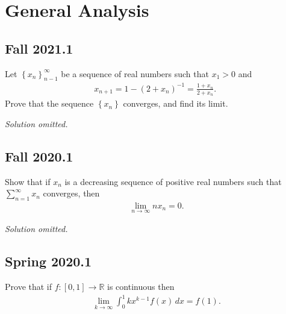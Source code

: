 \hypertarget{general-analysis}{%
\section{General Analysis}\label{general-analysis}}

\hypertarget{fall-2021.1}{%
\subsection{Fall 2021.1}\label{fall-2021.1}}

\begin{problem}[?]

Let \(\left\{x_{n}\right\}_{n-1}^{\infty}\) be a sequence of real
numbers such that \(x_{1}>0\) and
\begin{align*}
x_{n+1}=1-\left(2+x_{n}\right)^{-1}=\frac{1+x_{n}}{2+x_{n}} \text {. }
\end{align*}
Prove that the sequence \(\left\{x_{n}\right\}\) converges, and find its
limit.

\end{problem}

\emph{Solution omitted.}

\hypertarget{fall-2020.1}{%
\subsection{Fall 2020.1}\label{fall-2020.1}}

\begin{problem}[?]

Show that if \(x_n\) is a decreasing sequence of positive real numbers
such that \(\sum_{n=1}^\infty x_n\) converges, then
\begin{align*}
\lim_{n\to\infty} n x_n = 0.
\end{align*}

\end{problem}

\emph{Solution omitted.}

\hypertarget{spring-2020.1}{%
\subsection{Spring 2020.1}\label{spring-2020.1}}

Prove that if \(f: [0, 1] \to {\mathbb{R}}\) is continuous then
\begin{align*}
\lim_{k\to\infty} \int_0^1 kx^{k-1} f(x) \,dx = f(1)
.\end{align*}


